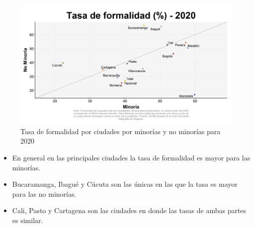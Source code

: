     \begin{figure}[H]
        \caption{Tasa de formalidad por ciudades por minorías y no minorías para 2020 \label{map_result_2} }
        \begin{center}
        \includegraphics[width=\textwidth,keepaspectratio]{img/var_57_scatter.png}
        \end{center}
    \end{figure}
            \begin{itemize}
                \item En general en las principales ciudades la tasa de formalidad es mayor para las minorías.
                \item Bucaramanga, Ibagué y Cúcuta son las únicas en las que la tasa es mayor para las no minorías.
                \item Cali, Pasto y Cartagena son las ciudades en donde las tasas de ambas partes es similar.
                \end{itemize}

